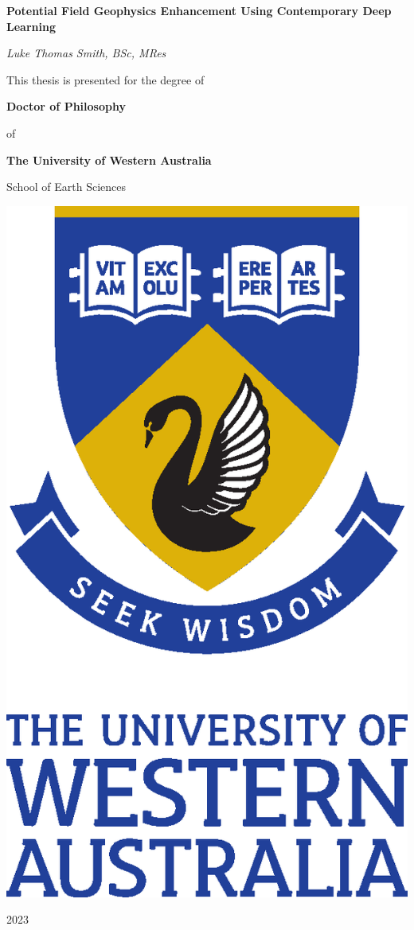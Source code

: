 \documentclass[12pt,a4paper,notitlepage]{report} %
\begin{document}
\begin{titlepage}
    \centering

    \vspace*{48 pt}
    {\large\textbf{Potential Field Geophysics Enhancement Using Contemporary Deep Learning}}

    \vspace{48 pt}
    {\itshape{{\Large Luke Thomas Smith}, BSc, MRes}}

    \vspace{48 pt}
    This thesis is presented for the degree of

    \vspace{14 pt}
    \textbf{Doctor of Philosophy}

    of

    \textbf{The University of Western Australia}

    \vspace{14 pt}
    School of Earth Sciences

    \vspace{72 pt}
    \includegraphics[scale=0.35]{fig/etc/UWA_FORMAL_PORTRAIT_CMYK}

    \vspace*{\fill}
    2023
\end{titlepage}
\end{document}
